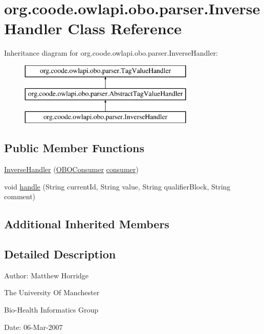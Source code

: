 \hypertarget{classorg_1_1coode_1_1owlapi_1_1obo_1_1parser_1_1_inverse_handler}{\section{org.\-coode.\-owlapi.\-obo.\-parser.\-Inverse\-Handler Class Reference}
\label{classorg_1_1coode_1_1owlapi_1_1obo_1_1parser_1_1_inverse_handler}
}
Inheritance diagram for org.\-coode.\-owlapi.\-obo.\-parser.\-Inverse\-Handler\-:\begin{figure}[H]
\begin{center}
\leavevmode
\includegraphics[height=3.000000cm]{classorg_1_1coode_1_1owlapi_1_1obo_1_1parser_1_1_inverse_handler}
\end{center}
\end{figure}
\subsection*{Public Member Functions}
\begin{DoxyCompactItemize}
\item 
\hyperlink{classorg_1_1coode_1_1owlapi_1_1obo_1_1parser_1_1_inverse_handler_affe9ec4ff8bf5bd925e751515b31aff8}{Inverse\-Handler} (\hyperlink{classorg_1_1coode_1_1owlapi_1_1obo_1_1parser_1_1_o_b_o_consumer}{O\-B\-O\-Consumer} \hyperlink{classorg_1_1coode_1_1owlapi_1_1obo_1_1parser_1_1_abstract_tag_value_handler_ab27f1ff22d15640c5f81585f18265137}{consumer})
\item 
void \hyperlink{classorg_1_1coode_1_1owlapi_1_1obo_1_1parser_1_1_inverse_handler_a71cbb89660a62d5fc87d2c08cdfb5382}{handle} (String current\-Id, String value, String qualifier\-Block, String comment)
\end{DoxyCompactItemize}
\subsection*{Additional Inherited Members}


\subsection{Detailed Description}
Author\-: Matthew Horridge\par
 The University Of Manchester\par
 Bio-\/\-Health Informatics Group\par
 Date\-: 06-\/\-Mar-\/2007\par
\par
 

